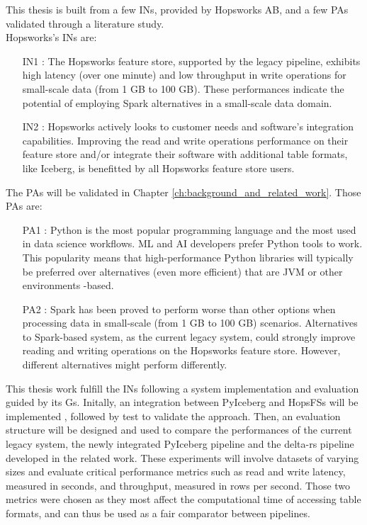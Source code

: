 This thesis is built from a few \glspl{IN}, provided by Hopsworks AB, and a few \glspl{PA} validated through a literature study. \\ Hopsworks's \glspl{IN} are:
\begin{itemize}
    \item[IN1 :] The Hopsworks feature store, supported by the legacy pipeline, exhibits high latency (over one minute) and low throughput in write operations for small-scale data (from 1 GB to 100 GB). These performances indicate the potential of employing Spark alternatives in a small-scale data domain.
    \item[IN2 :] Hopsworks actively looks to customer needs and software's integration capabilities. Improving the read and write operations performance on their feature store and/or integrate their software with additional table formats, like Iceberg, is benefitted by all Hopsworks feature store users.
\end{itemize}
The \glspl{PA} will be validated in Chapter \ref{ch:background_and_related_work}. Those \glspl{PA} are: 
\begin{itemize}
    \item[PA1 :] Python is the most popular programming language and the most used in data science workflows. \gls{ML} and \gls{AI} developers prefer Python tools to work. This popularity means that high-performance Python libraries will typically be preferred over alternatives (even more efficient) that are \gls{JVM} or other environments -based.
    \item[PA2 :] Spark has been proved to perform worse than other options when processing data in small-scale (from 1 GB to 100 GB) scenarios. Alternatives to Spark-based system, as the current legacy system, could strongly improve reading and writing operations on the Hopsworks feature store. However, different alternatives might perform differently.
\end{itemize}

This thesis work fulfill the \glspl{IN} following a system implementation and evaluation guided by its \glspl{G}. Initally, an integration between PyIceberg and \glspl{HopsFS} will be implemented \cite{niaziHopsFSScalingHierarchical2017}, followed by test to validate the approach. Then, an evaluation structure will be designed and used to compare the performances of the current legacy system, the newly integrated PyIceberg pipeline and the delta-rs pipeline developed in the related work. These experiments will involve datasets of varying sizes and evaluate critical performance metrics such as read and write latency, measured in seconds, and throughput, measured in rows per second. Those two metrics were chosen as they most affect the computational time of accessing table formats, and can thus be used as a fair comparator between pipelines.